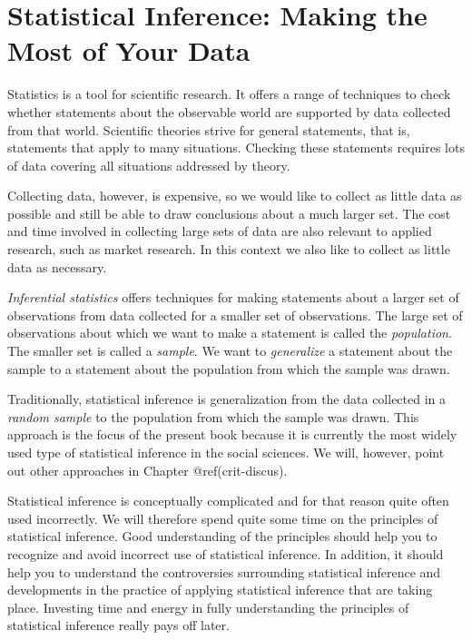 \documentclass[
  letterpaper,
  DIV=11,
  numbers=noendperiod]{scrreprt}
\begin{document}
\hypertarget{statistical-inference-making-the-most-of-your-data}{%
\chapter{Statistical Inference: Making the Most of Your
Data}\label{statistical-inference-making-the-most-of-your-data}}

Statistics is a tool for scientific research. It offers a range of
techniques to check whether statements about the observable world are
supported by data collected from that world. Scientific theories strive
for general statements, that is, statements that apply to many
situations. Checking these statements requires lots of data covering all
situations addressed by theory.

Collecting data, however, is expensive, so we would like to collect as
little data as possible and still be able to draw conclusions about a
much larger set. The cost and time involved in collecting large sets of
data are also relevant to applied research, such as market research. In
this context we also like to collect as little data as necessary.

\emph{Inferential statistics} offers techniques for making statements
about a larger set of observations from data collected for a smaller set
of observations. The large set of observations about which we want to
make a statement is called the \emph{population}. The smaller set is
called a \emph{sample}. We want to \emph{generalize} a statement about
the sample to a statement about the population from which the sample was
drawn.

Traditionally, statistical inference is generalization from the data
collected in a \emph{random sample} to the population from which the
sample was drawn. This approach is the focus of the present book because
it is currently the most widely used type of statistical inference in
the social sciences. We will, however, point out other approaches in
Chapter @ref(crit-discus).

Statistical inference is conceptually complicated and for that reason
quite often used incorrectly. We will therefore spend quite some time on
the principles of statistical inference. Good understanding of the
principles should help you to recognize and avoid incorrect use of
statistical inference. In addition, it should help you to understand the
controversies surrounding statistical inference and developments in the
practice of applying statistical inference that are taking place.
Investing time and energy in fully understanding the principles of
statistical inference really pays off later.
\end{document}

